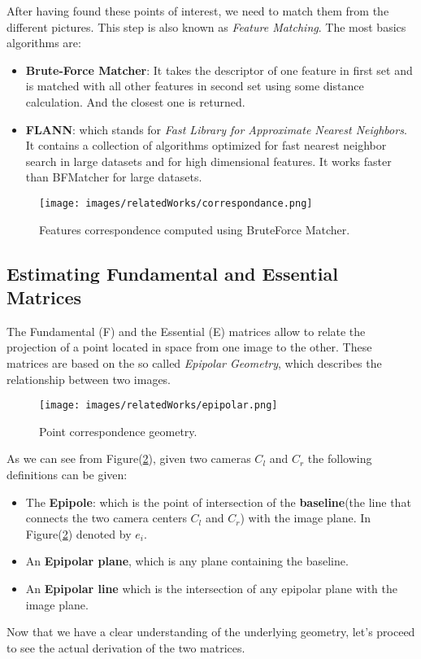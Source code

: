 After having found these points of interest, we need to match them from the different pictures. This step is also known
as \textit{Feature Matching}. The most basics algorithms are:
\begin{itemize}
    \item \textbf{Brute-Force Matcher}: It takes the descriptor of one feature in first set and is matched with all 
            other features in second set using some distance calculation. And the closest one is returned.
    \item \textbf{FLANN}: which stands for \textit{Fast Library for Approximate Nearest Neighbors}. It contains a collection of algorithms optimized
     for fast nearest neighbor search in large datasets and for high dimensional features. It works faster than BFMatcher for large datasets.
\end{itemize}

\begin{figure}
    \centering
    \texttt{[image: images/relatedWorks/correspondance.png]} %
    \caption{Features correspondence computed using BruteForce Matcher.}
    \label{fig:politoCorresponance}
\end{figure}


 \subsection{Estimating Fundamental and Essential Matrices}
The Fundamental (F) and the Essential (E) matrices allow to relate the projection of a point located in space from one image to the other.
These matrices are based on the so called \textit{Epipolar Geometry}, which describes the relationship between two images.
\begin{figure}
    \centering
    \texttt{[image: images/relatedWorks/epipolar.png]} %
    \caption{Point correspondence geometry. }
    \label{fig:epipolar}
\end{figure}
As we can see from Figure(\ref{fig:epipolar}), given two cameras $C_l$ and $C_r$ the following definitions can be given:
\begin{itemize}
    \item The \textbf{Epipole}: which is the point of intersection of the \textbf{baseline}(the line that connects the two camera centers
    $C_l$ and $C_r$) with the image plane. In Figure(\ref{fig:epipolar}) denoted by $e_i$.
    \item An \textbf{Epipolar plane}, which is any plane containing the baseline.
    \item An \textbf{Epipolar line} which is the intersection of any epipolar plane with the image plane.

\end{itemize}
Now that we have a clear understanding of the underlying geometry, let's proceed to see the actual derivation of the
two matrices.

